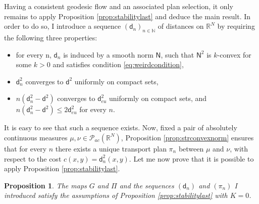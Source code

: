 \documentclass[11pt,twoside,a4paper]{article}
\newcommand{\setN}{\mathbb{N}}
\newcommand{\R}{\mathbb{R}}
\newcommand{\di}{\mathsf d} %
\newcommand{\Prob}{\mathscr{P}}
\theoremstyle{theorem}
\newtheorem{prop}[theorem]{Proposition}
\theoremstyle{definition}
\theoremstyle{remark}
\theoremstyle{proof}
\begin{document}
Having a consistent geodesic flow and an associated plan selection, it only remains to apply Proposition \ref{prop:stabilitylast} and deduce the main result. In order to do so, I introduce a sequence $(\di_n)_{n\in \setN}$ of distances on $\R^N$ by requiring the following three properties:
\begin{itemize}
\item for every n, $\di_n$ is induced by a smooth norm $\mathsf N$, such that $\mathsf N^2$ is $k$-convex for some $k>0$ and satisfies condition \eqref{eq:weirdcondition},
    \item $\di_n^2$ converges to $\di^2$ uniformly on compact sets,
    \item $n (\di^2_n - \di^2)$ converges to $\di^2_{eu}$ uniformly on compact sets, and $n (\di^2_n - \di^2)\leq2\di^2_{eu}$ for every $n$.
\end{itemize}
It is easy to see that such a sequence exists. Now, fixed a pair of absolutely continuous measures $\mu,\nu\in \Prob_{ac}(\R^N)$, Proposition \ref{prop:strconvexnorm} ensures that for every $n$ there exists a unique transport plan $\pi_n$ between $\mu$ and $\nu$, with respect to the cost $c(x,y)= \di_n^2(x,y)$. Let me now prove that it is possible to apply Proposition \ref{prop:stabilitylast}.

\begin{prop}
 The maps $G$ and $\Pi$ and the sequences $(\di_n)$ and $(\pi_n)$ I introduced satisfy the assumptions of Proposition \ref{prop:stabilitylast} with $K=0$.
\end{prop}
 
\end{document}
